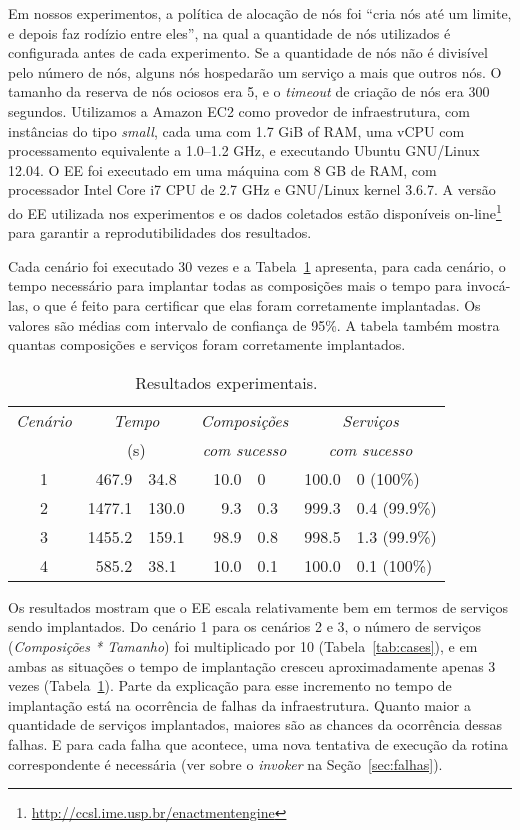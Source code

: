Em nossos experimentos, a política de alocação de nós foi ``cria nós até um limite, e depois faz rodízio entre eles'',
na qual a quantidade de nós utilizados é configurada antes de cada experimento.
Se a quantidade de nós não é divisível pelo número de nós,
alguns nós hospedarão um serviço a mais que outros nós.
O tamanho da reserva de nós ociosos era 5,
e o \emph{timeout} de criação de nós era 300 segundos.
Utilizamos a Amazon EC2 como provedor de infraestrutura,
com instâncias do tipo \emph{small},
cada uma com 1.7 GiB of RAM, uma vCPU com processamento
equivalente a 1.0--1.2 GHz, e executando Ubuntu GNU/Linux 12.04.
O EE foi executado em uma máquina com 8 GB de RAM,
com processador Intel Core i7 CPU de 2.7 GHz e GNU/Linux kernel 3.6.7.
A versão do EE utilizada nos experimentos e os dados coletados estão disponíveis 
on-line\footnote{\url{http://ccsl.ime.usp.br/enactmentengine}}
para garantir a reprodutibilidades dos resultados.

Cada cenário foi executado 30 vezes e a Tabela~\ref{tab:results}
apresenta, para cada cenário, o tempo necessário para implantar
todas as composições mais o tempo para invocá-las, o que é feito
para certificar que elas foram corretamente implantadas.
Os valores são médias com intervalo de confiança de 95\%.
A tabela também mostra quantas composições e serviços foram corretamente implantados.

\begin{table}
\centering
\caption{Resultados experimentais.}
\label{tab:results}
\begin{tabular}{c r@{ $\pm$ }l r@{ $\pm$ }l r@{ $\pm$ }l} \hline

\emph{Cenário} & \multicolumn{2}{c}{\emph{Tempo}} & \multicolumn{2}{c}{\emph{Composições}}   & \multicolumn{2}{c}{\emph{Serviços}}\\
                 & \multicolumn{2}{c}{(s)}           & \multicolumn{2}{c}{\emph{com sucesso}} & \multicolumn{2}{c}{\emph{com sucesso}}\\
\hline
1 &  467.9 &  34.8 & 10.0 & 0   & 100.0 & 0   (100\%) \\
2 & 1477.1 & 130.0 &  9.3 & 0.3 & 999.3 & 0.4 (99.9\%)\\
3 & 1455.2 & 159.1 & 98.9 & 0.8 & 998.5 & 1.3 (99.9\%)\\
4 &  585.2 &  38.1 & 10.0 & 0.1 & 100.0 & 0.1 (100\%)\\
\hline \end{tabular}
\end{table}

Os resultados mostram que o EE escala relativamente bem em termos de serviços sendo implantados.
Do cenário 1 para os cenários 2 e 3, o número de serviços (\emph{Composições * Tamanho}) 
foi multiplicado por 10 (Tabela~\ref{tab:cases}),
e em ambas as situações o tempo de implantação cresceu aproximadamente apenas 3 vezes
(Tabela~\ref{tab:results}). 
Parte da explicação para esse incremento no tempo de implantação
está na ocorrência de falhas da infraestrutura.
Quanto maior a quantidade de serviços implantados, 
maiores são as chances da ocorrência dessas falhas.
E para cada falha que acontece, uma nova tentativa de execução
da rotina correspondente é necessária 
(ver sobre o \emph{invoker} na Seção~\ref{sec:falhas}).

